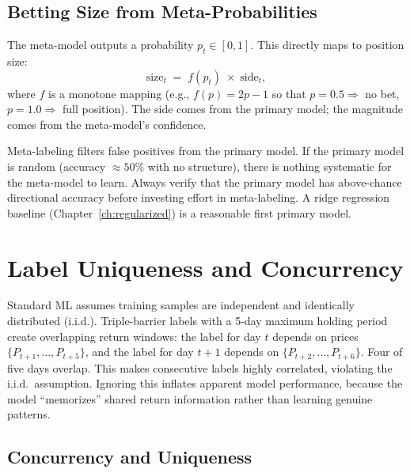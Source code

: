 \subsection{Betting Size from Meta-Probabilities}

The meta-model outputs a probability $p_t \in [0,1]$.
This directly maps to position size:
\begin{equation}
\label{eq:bet-size}
\text{size}_t \;=\; f(p_t) \;\times\; \text{side}_t,
\end{equation}
where $f$ is a monotone mapping (e.g., $f(p) = 2p - 1$ so that
$p = 0.5 \Rightarrow$ no bet, $p = 1.0 \Rightarrow$ full position).
The side comes from the primary model; the magnitude comes from the
meta-model's confidence.

\begin{warning}
Meta-labeling filters false positives from the primary model.
If the primary model is random (accuracy $\approx 50\%$ with no structure),
there is nothing systematic for the meta-model to learn.
Always verify that the primary model has above-chance directional accuracy
before investing effort in meta-labeling.
A ridge regression baseline (Chapter~\ref{ch:regularized}) is a
reasonable first primary model.
\end{warning}


\section{Label Uniqueness and Concurrency}
\label{sec:label-uniqueness}

\begin{prereq}
Standard ML assumes training samples are independent and identically
distributed (i.i.d.).
Triple-barrier labels with a 5-day maximum holding period create
overlapping return windows: the label for day $t$ depends on prices
$\{P_{t+1}, \ldots, P_{t+5}\}$, and the label for day $t+1$ depends on
$\{P_{t+2}, \ldots, P_{t+6}\}$.
Four of five days overlap.
This makes consecutive labels highly correlated, violating the
i.i.d.\ assumption.
Ignoring this inflates apparent model performance, because the model
``memorizes'' shared return information rather than learning genuine patterns.
\end{prereq}

\subsection{Concurrency and Uniqueness}

